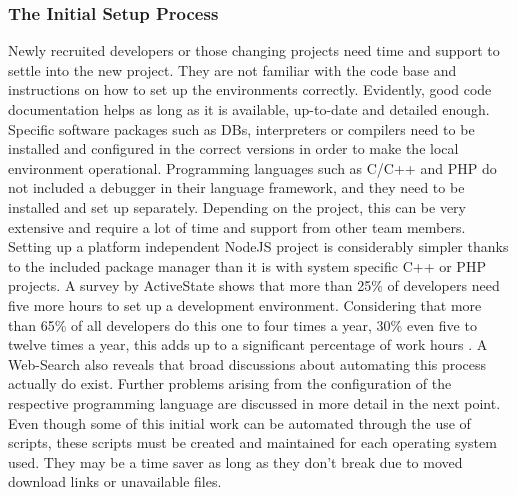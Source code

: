         \subsubsection{The Initial Setup Process}\label{sss::initial}
        Newly recruited developers or those changing projects need time and support to settle into the new project. They are not familiar with the code base and instructions on how to set up the environments correctly. Evidently, good code documentation helps as long as it is available, up-to-date and detailed enough. Specific software packages such as \ac{DB}s, interpreters or compilers need to be installed and configured in the correct versions in order to make the local environment operational. Programming languages such as C/C++ and PHP do not included a debugger in their language framework, and they need to be installed and set up separately. Depending on the project, this can be very extensive and require a lot of time and support from other team members. Setting up a platform independent NodeJS project is considerably simpler thanks to the included package manager  than it is with system specific C++ or PHP projects. A survey by ActiveState shows that more than 25\% of developers need five more hours to set up a development environment. Considering that more than 65\% of all developers do this one to four times a year, 30\% even five to twelve times a year, this adds up to a significant percentage of work hours \cite{setuppain}. A Web-Search also reveals that broad discussions about automating this process actually do exist. Further problems arising from the configuration of the respective programming language are discussed in more detail in the next point. \newline
        Even though some of this initial work can be automated through the use of scripts, these scripts must be created and maintained for each operating system used. They may be a time saver as long as they don't break due to moved download links or unavailable files.

